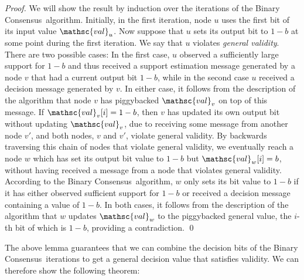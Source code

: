 \documentclass[leqno,11pt]{article}
\newcommand{\val}{{\mathsc{val}}}
\newcommand{\bc}{{\sc Binary Consensus}}
\begin{document}
\begin{proof}
  We will show the result by induction over the iterations of the \bc\ algorithm. 
  Initially, in the first iteration, node $u$ uses the first bit of its input value $\val_u$.
  Now suppose that $u$ sets its output bit to $1-b$ at some point during the first iteration.
  We say that $u$ violates \emph{general validity}.
  There are two possible cases: In the first case, $u$ observed a sufficiently large support for $1-b$ and thus received a support estimation message generated by a node $v$ that had a current output bit $1-b$, while in the second case $u$ received a decision message generated by $v$.
  In either case, it follows from the description of the algorithm that node $v$ has piggybacked $\val_v$ on top of this message.
  If $\val_v[i]=1-b$, then $v$ has updated its own output bit without updating $\val_v$, due to receiving some message from another node $v'$, and both nodes, $v$ and $v'$, violate general validity.
 By backwards traversing this chain of nodes that violate general validity, we eventually reach a node $w$ which has set its output bit value to $1-b$ but $\val_w[i]=b$, without having received a message from a node that violates general validity.
  According to the \bc\ algorithm, $w$ only sets its bit value to $1-b$ if it has either observed sufficient support for $1-b$ or received a decision message containing a value of $1-b$.
  In both cases, it follows from the description of the algorithm that $w$ updates $\val_w$ to the piggybacked general value, the $i$-th bit of which is $1-b$, providing a contradiction.
  \qed
\end{proof}
The above lemma guarantees that we can combine the decision bits of the \bc\ iterations to get a general decision value that satisfies validity. 
We can therefore show the following theorem:
\end{document}
